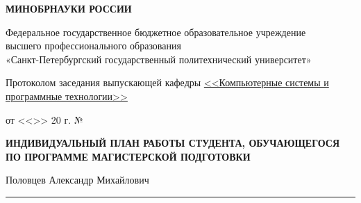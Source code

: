 \begin{center}

\textbf{МИНОБРНАУКИ РОССИИ}

\vspace{1em}
Федеральное государственное бюджетное образовательное учреждение\\
высшего профессионального образования\\
«Санкт-Петербургский государственный политехнический университет»

\end{center}

\vspace{1em}

\begin{multicols}{2}

    \phantom{foo}

    \columnbreak


    \begin{flushleft}
        Протоколом заседания выпускающей кафедры
        \uline{<<Компьютерные системы и программные технологии>> \hfill}

        \vspace{1em}

        от <<\uline{\hphantom{200}}>> \uline{\hphantom{декабрььььь}}
        20\uline{\hphantom{130}} г. № \uline{\hphantom{1300}}
    \end{flushleft}
\end{multicols}

\vspace{15pt}

\begin{center}
    \textbf{ИНДИВИДУАЛЬНЫЙ ПЛАН РАБОТЫ СТУДЕНТА, ОБУЧАЮЩЕГОСЯ ПО ПРОГРАММЕ
    МАГИСТЕРСКОЙ ПОДГОТОВКИ}

    \vspace{1em}

    Половцев Александр Михайлович\hrule
\end{center}


